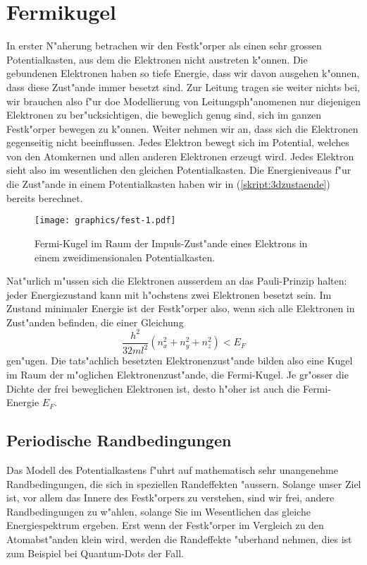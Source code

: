 \section{Fermikugel}
In erster N"aherung betrachen wir den Festk"orper als einen
sehr grossen Potentialkasten, aus dem die Elektronen nicht austreten
k"onnen.
Die gebundenen Elektronen haben so tiefe Energie, dass wir davon
ausgehen k"onnen, dass diese Zust"ande immer besetzt sind.
Zur Leitung tragen sie weiter nichts bei, wir brauchen also f"ur
doe Modellierung von Leitungsph"anomenen nur diejenigen Elektronen
zu ber"ucksichtigen, die beweglich genug sind, sich im ganzen
Festk"orper bewegen zu k"onnen.
Weiter nehmen wir an, dass sich die Elektronen gegenseitig 
nicht beeinflussen.
Jedes Elektron bewegt sich im Potential, welches von den Atomkernen
und allen anderen Elektronen erzeugt wird.
Jedes Elektron sieht also im wesentlichen den gleichen Potentialkasten.
Die Energieniveaus f"ur die Zust"ande in einem Potentialkasten haben
wir in (\ref{skript:3dzustaende}) bereits berechnet.
\begin{figure}
\centering
\texttt{[image: graphics/fest-1.pdf]}
\caption{Fermi-Kugel im Raum der Impuls-Zust"ande eines Elektrons in einem
zweidimensionalen Potentialkasten.
\label{skript:fermi-kugel}}
\end{figure}
Nat"urlich m"ussen sich die Elektronen ausserdem an das Pauli-Prinzip
halten: jeder Energiezustand kann mit h"ochstens zwei Elektronen
besetzt sein. 
Im Zustand minimaler Energie ist der Festk"orper also, wenn sich
alle Elektronen in Zust"anden befinden, die einer Gleichung
\[
\frac{h^2}{32ml^2}(
n_x^2
+
n_y^2
+
n_z^2
)
<
E_F
\]
gen"ugen.
Die tats"achlich besetzten Elektronenzust"ande bilden also eine Kugel
im Raum der m"oglichen Elektronenzust"ande, die Fermi-Kugel.
Je gr"osser die Dichte der frei beweglichen Elektronen ist, desto
h"oher ist auch die Fermi-Energie $E_F$.


\subsection{Periodische Randbedingungen}
Das Modell des Potentialkastens f"uhrt auf mathematisch sehr unangenehme
Randbedingungen, die sich in speziellen Randeffekten "aussern.
Solange unser Ziel ist, vor allem das Innere des Festk"orpers zu verstehen,
sind wir frei, andere Randbedingungen zu w"ahlen, solange Sie im Wesentlichen
das gleiche Energiespektrum ergeben. Erst wenn der Festk"orper im Vergleich
zu den Atomabst"anden klein wird, werden die Randeffekte "uberhand nehmen,
dies ist zum Beispiel bei Quantum-Dots der Fall. 

